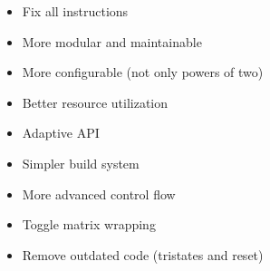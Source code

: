 \begin{itemize}
    \item Fix all instructions
    \item More modular and maintainable
    \item More configurable (not only powers of two)
    \item Better resource utilization
    \item Adaptive API
    \item Simpler build system
    \item More advanced control flow
    \item Toggle matrix wrapping
    \item Remove outdated code (tristates and reset)
\end{itemize}
